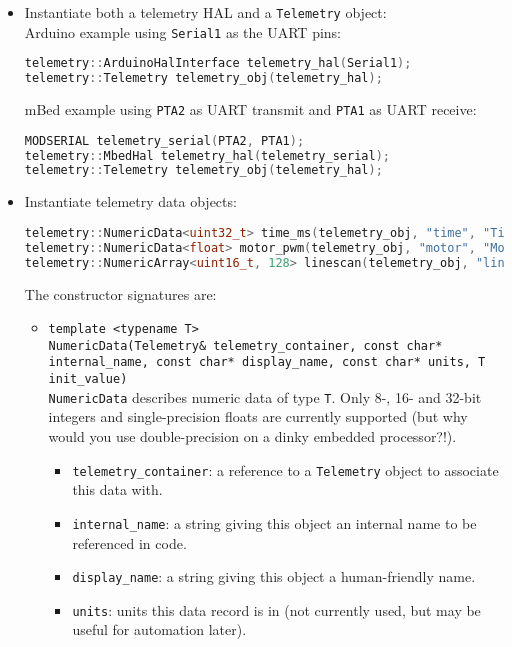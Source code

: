 \documentclass[11pt]{article}
\begin{document}
\begin{itemize}
  \item Instantiate both a telemetry HAL and a \texttt{Telemetry} object: \\
  Arduino example using \texttt{Serial1} as the UART pins:
  \begin{lstlisting}[language=C++]
telemetry::ArduinoHalInterface telemetry_hal(Serial1);
telemetry::Telemetry telemetry_obj(telemetry_hal);
  \end{lstlisting}  
  mBed example using \texttt{PTA2} as UART transmit and \texttt{PTA1} as UART receive:
  \begin{lstlisting}[language=C++]
MODSERIAL telemetry_serial(PTA2, PTA1);
telemetry::MbedHal telemetry_hal(telemetry_serial);
telemetry::Telemetry telemetry_obj(telemetry_hal);
  \end{lstlisting}
  \item Instantiate telemetry data objects:
  \begin{lstlisting}[language=C++]
telemetry::NumericData<uint32_t> time_ms(telemetry_obj, "time", "Time", "ms", 0);
telemetry::NumericData<float> motor_pwm(telemetry_obj, "motor", "Motor PWM", "\%DC", 0);
telemetry::NumericArray<uint16_t, 128> linescan(telemetry_obj, "linescan", "Linescan", "ADC", 0);  
  \end{lstlisting}
  The constructor signatures are:
  \begin{itemize}
    \item \texttt{template <typename T>\\ NumericData(Telemetry\& telemetry\_container, const char* internal\_name, const char* display\_name, const char* units, T init\_value)} \\
    \texttt{NumericData} describes numeric data of type \texttt{T}. Only 8-, 16- and 32-bit integers and single-precision floats are currently supported (but why would you use double-precision on a dinky embedded processor?!).
    \begin{itemize}
      \item \texttt{telemetry\_container}: a reference to a \texttt{Telemetry} object to associate this data with.
      \item \texttt{internal\_name}: a string giving this object an internal name to be referenced in code.
      \item \texttt{display\_name}: a string giving this object a human-friendly name.
      \item \texttt{units}: units this data record is in (not currently used, but may be useful for automation later).

\end{itemize}
\end{itemize}
\end{itemize}
\end{document}
